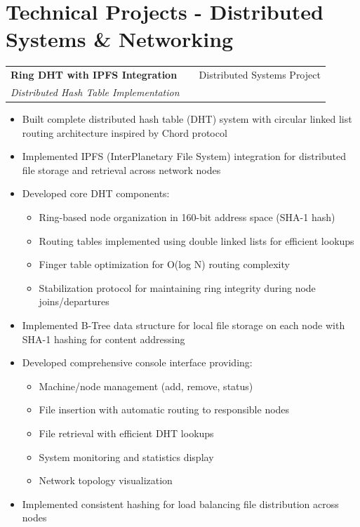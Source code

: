 \documentclass[a4paper,12pt]{article}
\makeatletter
\newenvironment{projectdetailed}[3]
    {
    \begin{tabularx}{\linewidth}{@{}l X r@{}}
    \textbf{#1} & \hfill & #2 \\
    \textit{#3} & & \\[3.75pt]
    \end{tabularx}
    \begin{minipage}[t]{\linewidth}
    \begin{itemize}[nosep,after=\strut, leftmargin=1em, itemsep=2pt,label=--]
    }
    {
    \end{itemize}
    \end{minipage}
    \vspace{6pt}
    }
\makeatother
\begin{document}
\section{Technical Projects - Distributed Systems \& Networking}

\begin{projectdetailed}{Ring DHT with IPFS Integration}{Distributed Systems Project}{Distributed Hash Table Implementation}
\item Built complete distributed hash table (DHT) system with circular linked list routing architecture inspired by Chord protocol
\item Implemented IPFS (InterPlanetary File System) integration for distributed file storage and retrieval across network nodes
\item Developed core DHT components:
\begin{itemize}[nosep, leftmargin=2em]
    \item Ring-based node organization in 160-bit address space (SHA-1 hash)
    \item Routing tables implemented using double linked lists for efficient lookups
    \item Finger table optimization for O(log N) routing complexity
    \item Stabilization protocol for maintaining ring integrity during node joins/departures
\end{itemize}
\item Implemented B-Tree data structure for local file storage on each node with SHA-1 hashing for content addressing
\item Developed comprehensive console interface providing:
\begin{itemize}[nosep, leftmargin=2em]
    \item Machine/node management (add, remove, status)
    \item File insertion with automatic routing to responsible nodes
    \item File retrieval with efficient DHT lookups
    \item System monitoring and statistics display
    \item Network topology visualization
\end{itemize}
\item Implemented consistent hashing for load balancing file distribution across nodes

\end{projectdetailed}
\end{document}
